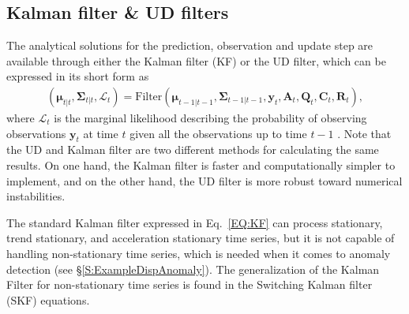 \subsection{Kalman filter \& UD filters}
\label{SS:KFUD}
The analytical solutions for the prediction, observation and update step are available through either the Kalman filter (KF) or the UD filter, which can be expressed in its short form as
\begin{equation}
    \begin{split}
      (\bm{\mu}_{t|t},\bm{\Sigma}_{t|t}, \mathcal{L}_{t}) = \text{Filter}(\bm{\mu}_{t-1|t-1},\bm{\Sigma}_{t-1|t-1},\mathbf{y}_{t}, \mathbf{A}_{t},  \mathbf{Q}_{t},   \mathbf{C}_{t},  \mathbf{R}_{t}),
      \end{split}
\label{EQ:KF}
\end{equation}
where $\mathcal{L}_{t}$ is the marginal likelihood describing the probability of observing observations $\mathbf{y}_{t}$ at time $t$ given all the observations up to time $t-1$ \cite{sarkka2013bayesian}. 
Note that the UD and Kalman filter are two different methods for calculating the same results. On one hand, the Kalman filter is faster and computationally simpler to implement, and on the other hand, the UD filter is more robust toward numerical instabilities.   


The standard Kalman filter expressed in Eq.~\ref{EQ:KF} can process stationary, trend stationary, and acceleration stationary time series, but it is not capable of handling non-stationary time series, which is needed when it comes to anomaly detection (see \S\ref{S:ExampleDispAnomaly}).
The generalization of the Kalman Filter for non-stationary time series is found in the Switching Kalman filter (SKF) equations.

